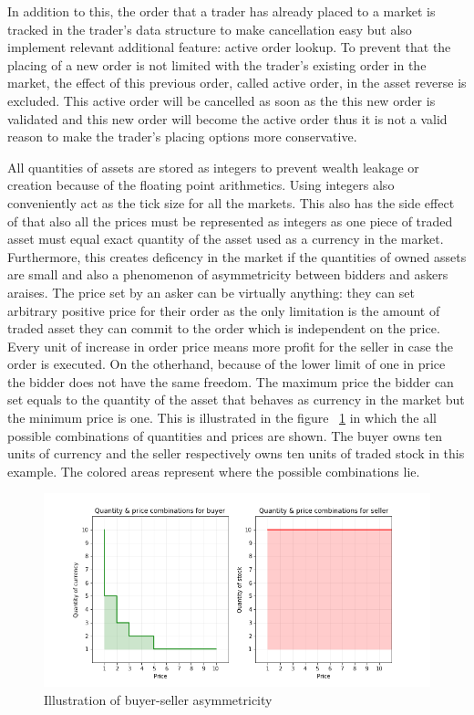 In addition to this, the order that a trader has already placed
to a market is tracked in the trader's data structure to make cancellation easy
but also implement relevant additional feature: active order lookup. To prevent that
the placing of a new order is not limited with the trader's existing order in the market,
the effect of this previous order, called active order, in the asset reverse is excluded. 
This active order will be cancelled as soon as the this new order is validated and this new order
will become the active order thus it is not a valid reason to make the trader's placing 
options more conservative.

All quantities of assets are stored as integers to prevent wealth leakage
or creation because of the floating point arithmetics. Using integers also
conveniently act as the tick size for all the markets. This also has the side effect
of that also all the prices must be represented as integers as one piece
of traded asset must equal exact quantity of the asset used as a currency
in the market. Furthermore, this creates deficency in the market if the quantities
of owned assets are small and also a phenomenon of asymmetricity between bidders and askers
araises. The price set by an asker can be virtually anything: they can set
arbitrary positive price for their order as the only limitation is the amount
of traded asset they can commit to the order which is independent on the price. 
Every unit of increase in order price means more profit for the seller
in case the order is executed. On the otherhand, because of the 
lower limit of one in price the bidder does not have the same freedom.
The maximum price the bidder can set equals to the quantity of the asset
that behaves as currency in the market but the minimum price is one. This is
illustrated in the figure ~\ref{fig:buy_sell_asym} in which the all possible
combinations of quantities and prices are shown. The buyer owns
ten units of currency and the seller respectively owns ten units of traded stock in
this example. The colored areas represent where the possible combinations
lie.

 \begin{figure}
    \includegraphics[width=\linewidth]{plots/buyer_seller_asymmetricity.png}
    \caption{Illustration of buyer-seller asymmetricity}
    \label{fig:buy_sell_asym}
\end{figure}

